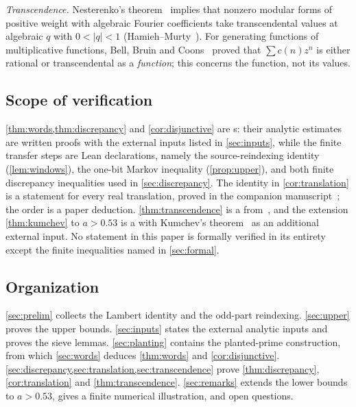 \documentclass[11pt]{article}
\begin{document}
\emph{Transcendence.} Nesterenko's theorem~\cite{Nesterenko1996} implies that
nonzero modular forms of positive weight with algebraic Fourier coefficients
take transcendental values at algebraic $q$ with $0<|q|<1$ (Hamieh--Murty~\cite[Thm.~3.1]{HamiehMurty2016}). For
generating functions of multiplicative functions, Bell, Bruin and
Coons~\cite{BellBruinCoons2012} proved that $\sum c(n)z^n$ is either rational or
transcendental as a \emph{function}; this concerns the function, not its
values.

\subsection{Scope of verification}\label{subsec:scope}

\cref{thm:words,thm:discrepancy} and \cref{cor:disjunctive} are
s: their analytic estimates are written
proofs with the external inputs listed in \cref{sec:inputs}, while the finite
transfer steps are Lean declarations, namely the source-reindexing identity
(\cref{lem:windows}), the one-bit Markov inequality (\cref{prop:upper}), and both
finite discrepancy inequalities used in \cref{sec:discrepancy}. The identity in
\cref{cor:translation} is a  statement for every real
translation, proved in the companion manuscript~\cite[Theorem~3.1]{DiscrepancyCompanion};
the order is a paper deduction. \cref{thm:transcendence} is a
 from~\cite{HamiehMurty2016}, and the extension
\cref{thm:kumchev} to $a>0.53$ is a  with Kumchev's
theorem~\cite{Kumchev2002} as an additional external input. No statement in this paper
is formally verified in its entirety except the finite inequalities named in
\cref{sec:formal}.

\subsection{Organization}

\cref{sec:prelim} collects the Lambert identity and the odd-part reindexing.
\cref{sec:upper} proves the upper bounds. \cref{sec:inputs} states the external
analytic inputs and proves the sieve lemmas. \cref{sec:planting} contains the
planted-prime construction, from which \cref{sec:words} deduces
\cref{thm:words} and \cref{cor:disjunctive}. \cref{sec:discrepancy,sec:translation,sec:transcendence}
prove \cref{thm:discrepancy}, \cref{cor:translation} and
\cref{thm:transcendence}. \cref{sec:remarks} extends the lower bounds to $a>0.53$, gives a
finite numerical illustration, and open questions.
\end{document}
